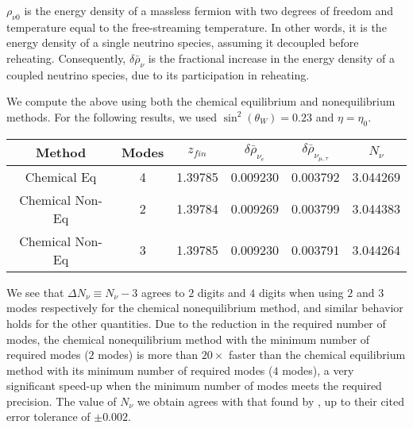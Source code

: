  $\rho_{\nu0}$ is the energy density of a massless fermion with two degrees of freedom and temperature equal to the free-streaming temperature.  In other words, it is the energy density of a single neutrino species, assuming it decoupled before reheating. Consequently, $\delta\bar\rho_\nu$ is the fractional increase in the energy density of a coupled neutrino species, due to its participation in reheating.

We compute the above using both the chemical equilibrium and nonequilibrium methods. For the following results, we used $\sin^2(\theta_W)=0.23$ and $\eta=\eta_0$. 
\begin{table}[ht]\label{table:method:comp}
\centering 
\begin{tabular}{|c|c|c|c|c|c|}
\hline
Method &Modes&$z_{fin}$ & $\delta\bar\rho_{\nu_e}$&   $\delta\bar\rho_{\nu_{\mu,\tau}}$ & $N_{\nu}$  \\
\hline
Chemical Eq& 4 &1.39785 &0.009230 &0.003792 &3.044269\\
\hline
Chemical Non-Eq& 2&1.39784 &0.009269 & 0.003799&3.044383 \\
\hline
Chemical Non-Eq& 3&1.39785&0.009230 & 0.003791&3.044264 \\
\hline
\end{tabular}
\end{table}
We see that $\Delta N_\nu\equiv N_\nu-3$ agrees to $2$ digits and $4$ digits when using $2$ and $3$ modes respectively for the chemical nonequilibrium method, and similar behavior holds for the other quantities. Due to the reduction in the required number of modes, the chemical nonequilibrium method with the minimum number of required modes ($2$ modes) is more than $20\times$ faster than the chemical equilibrium method with its minimum number of required modes ($4$ modes), a very significant speed-up when the minimum number of modes meets the required precision.  The value of $N_\nu$ we obtain agrees with that found by \cite{Mangano:2005cc}, up to their cited error tolerance of $\pm 0.002$.

